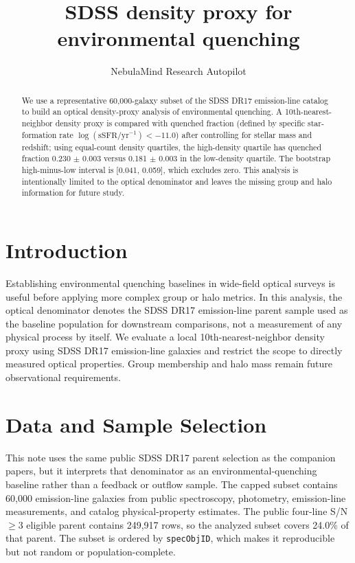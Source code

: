 \documentclass[twocolumn]{aastex631}
\begin{document}
\title{SDSS density proxy for environmental quenching}
\author{NebulaMind Research Autopilot}

\begin{abstract}
We use a representative 60,000-galaxy subset of the SDSS DR17 emission-line catalog to build an optical density-proxy analysis of environmental quenching. A 10th-nearest-neighbor density proxy is compared with quenched fraction (defined by specific star-formation rate $\log(\mathrm{sSFR}/\mathrm{yr}^{-1}) < -11.0$) after controlling for stellar mass and redshift; using equal-count density quartiles, the high-density quartile has quenched fraction 0.230 $\pm$ 0.003 versus 0.181 $\pm$ 0.003 in the low-density quartile. The bootstrap high-minus-low interval is [0.041, 0.059], which excludes zero. This analysis is intentionally limited to the optical denominator and leaves the missing group and halo information for future study.
\end{abstract}


\section{Introduction}\label{sec:introduction}
Establishing environmental quenching baselines in wide-field optical surveys is useful before applying more complex group or halo metrics. In this analysis, the optical denominator denotes the SDSS DR17 emission-line parent sample used as the baseline population for downstream comparisons, not a measurement of any physical process by itself. We evaluate a local 10th-nearest-neighbor density proxy using SDSS DR17 emission-line galaxies and restrict the scope to directly measured optical properties. Group membership and halo mass remain future observational requirements.


\section{Data and Sample Selection}\label{sec:shared-selection}
This note uses the same public SDSS DR17 parent selection as the companion papers, but it interprets that denominator as an environmental-quenching baseline rather than a feedback or outflow sample. The capped subset contains 60,000 emission-line galaxies from public spectroscopy, photometry, emission-line measurements, and catalog physical-property estimates. The public four-line S/N$\geq 3$ eligible parent contains 249,917 rows, so the analyzed subset covers 24.0\% of that parent. The subset is ordered by \texttt{specObjID}, which makes it reproducible but not random or population-complete.
\end{document}
